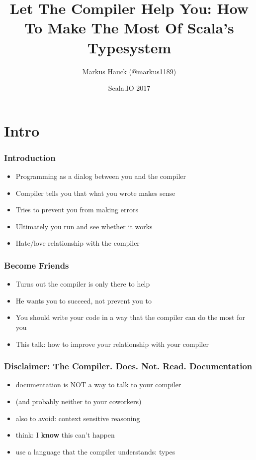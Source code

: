 \documentclass{beamer}
\title{Let The Compiler Help You: How To Make The Most Of Scala's Typesystem}
\author{Markus Hauck (@markus1189)}
\date{Scala.IO 2017}
\begin{document}
{
  \frame[plain]{\titlepage}
}

\section{Intro}
\label{sec:intro}

\begin{frame}
  \frametitle{Introduction}
  \begin{itemize}
  \item Programming as a dialog between you and the compiler
  \item Compiler tells you that what you wrote makes sense
  \item Tries to prevent you from making errors
  \item Ultimately you run and see whether it works
  \item Hate/love relationship with the compiler
  \end{itemize}
\end{frame}

\begin{frame}
  \frametitle{Become Friends}
  \begin{itemize}
  \item Turns out the compiler is only there to help
  \item He wants you to succeed, not prevent you to
  \item You should write your code in a way that the compiler can do
    the most for you
  \item This talk: how to improve your relationship with your compiler
  \end{itemize}
\end{frame}

\begin{frame}
  \frametitle{Disclaimer: The Compiler. Does. Not. Read. Documentation}
  \begin{itemize}
  \item documentation is NOT a way to talk to your compiler
  \item (and probably neither to your coworkers)
  \item also to avoid: context sensitive reasoning
  \item think: I \textbf{know} this can't happen
  \item use a language that the compiler understands: types
  \end{itemize}
\end{frame}
\end{document}
